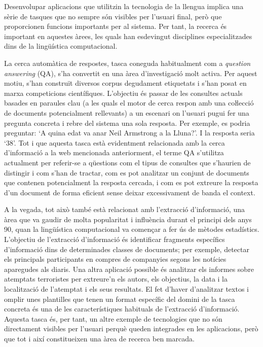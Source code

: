 \documentclass[]{../../metanetpaper}
\begin{document}
\begin{multicols}{2}
Desenvolupar aplicacions que utilitzin la tecnologia de la llengua implica una sèrie de tasques que no sempre són visibles per l’usuari final, però que proporcionen funcions importants per al sistema. Per tant, la recerca és important en aquestes àrees, les quals han esdevingut disciplines especialitzades dins de la lingüística computacional.

La cerca automàtica de respostes, tasca coneguda habitualment com a \textit{question answering} (QA), s’ha convertit en una àrea d’investigació molt activa. Per aquest motiu, s’han construït diversos corpus degudament etiquetats i s’han posat en marxa competicions científiques. L’objectiu és passar de les consultes actuals basades en paraules clau (a les quals el motor de cerca respon amb una coŀlecció de documents potencialment rellevants) a un escenari on l’usuari pugui fer una pregunta concreta i rebre del sistema una sola resposta. Per exemple, es podria preguntar: ‘A quina edat va anar Neil Armstrong a la Lluna?’. I la resposta seria ‘38’. Tot i que aquesta tasca està evidentment relacionada amb la cerca d’informació a la web mencionada anteriorment, el terme QA s’utilitza actualment per referir-se a qüestions com el tipus de consultes que s’haurien de distingir i com s’han de tractar, com es pot analitzar un conjunt de documents que contenen potencialment la resposta cercada, i com es pot extreure la resposta d’un document de forma eficient sense deixar excessivament de banda el context.

A la vegada, tot això també està relacionat amb l’extracció d’informació, una àrea que va gaudir de molta popularitat i influència durant el principi dels anys 90, quan la lingüística computacional va començar a fer ús de mètodes estadístics. L’objectiu de l’extracció d’informació és identificar fragments específics d’informació dins de determinades classes de documents; per exemple, detectar els principals participants en compres de companyies segons les notícies aparegudes als diaris. Una altra aplicació possible és analitzar els informes sobre atemptats terroristes per extreure’n els autors, els objectius, la data i la localització de l’atemptat i els seus resultats. El fet d’haver d’analitzar textos i omplir unes plantilles que tenen un format específic del domini de la tasca concreta és una de les característiques habituals de l’extracció d’informació. Aquesta tasca és, per tant, un altre exemple de tecnologies que no són directament visibles per l’usuari perquè queden integrades en les aplicacions, però que tot i així constitueixen una àrea de recerca ben marcada.


\end{multicols}
\end{document}
